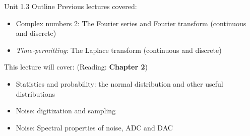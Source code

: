 \documentclass{beamer}
\begin{document}
\begin{frame}{Unit 1.3 Outline}
Previous lectures covered:
\begin{itemize}
\item Complex numbers 2: The Fourier series and Fourier transform (continuous and discrete)
\item \textit{Time-permitting}: The Laplace transform (continuous and discrete)
\end{itemize}
This lecture will cover: (Reading: \textbf{Chapter 2})
\begin{itemize}
\item \alert{Statistics and probability: the normal distribution and other useful distributions}
\item \alert{Noise: digitization and sampling}
\item Noise: Spectral properties of noise, ADC and DAC
\end{itemize}
\end{frame}
\end{document}
